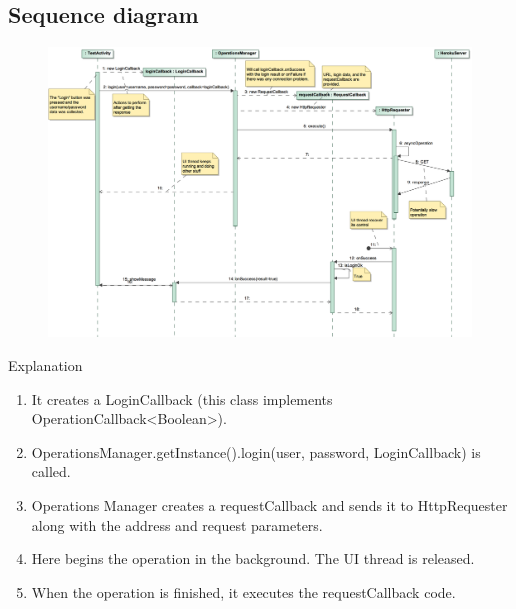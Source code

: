 \documentclass{beamer}
\begin{document}
\subsection{Sequence diagram}
\begin{frame}
\begin{figure}
\begin{center}
\includegraphics[scale=0.30]{../observer-pattern/diagrams/login}
\end{center}
\end{figure}
\end{frame}

\begin{frame}{Explanation}
\begin{enumerate}
\item It creates a LoginCallback (this class implements OperationCallback<Boolean>).
\item OperationsManager.getInstance().login(user, password, LoginCallback) is called.
\item Operations Manager creates a requestCallback and sends it to HttpRequester along with the address and request parameters.
\item Here begins the operation in the background. The UI thread is released.
\item When the operation is finished, it executes the requestCallback code.
\end{enumerate} 
\end{frame}
\end{document}
